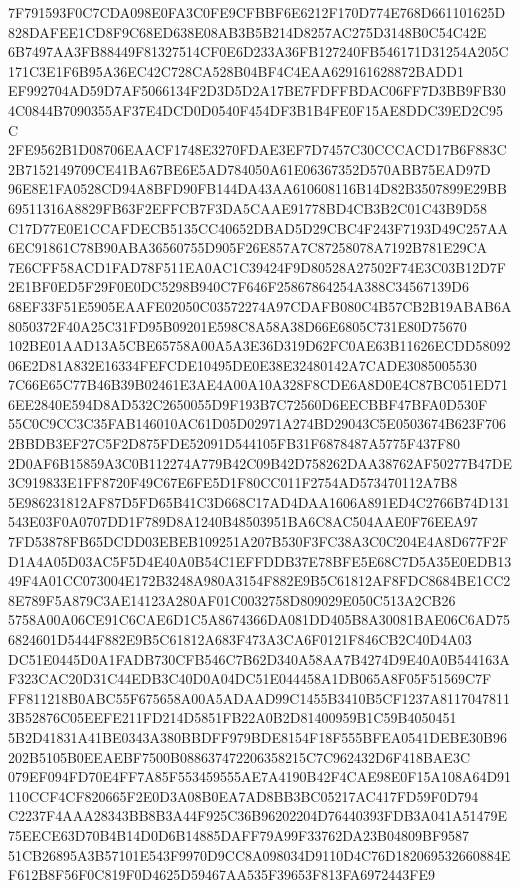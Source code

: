 \documentclass[UTF8,fontset=fandol,zihao=-4,a4paper]{ctexart}
\begin{document}
{{7F791593F0C7CDA098E0FA3C0FE9CFBBF6E6212F170D774E768D661101625D828DAFEE1CD8F9C68ED638E08AB3B5B214D8257AC275D3148B0C54C42E
6B7497AA3FB88449F81327514CF0E6D233A36FB127240FB546171D31254A205C171C3E1F6B95A36EC42C728CA528B04BF4C4EAA629161628872BADD1
EF992704AD59D7AF5066134F2D3D5D2A17BE7FDFFBDAC06FF7D3BB9FB304C0844B7090355AF37E4DCD0D0540F454DF3B1B4FE0F15AE8DDC39ED2C95C
2FE9562B1D08706EAACF1748E3270FDAE3EF7D7457C30CCCACD17B6F883C2B7152149709CE41BA67BE6E5AD784050A61E06367352D570ABB75EAD97D
96E8E1FA0528CD94A8BFD90FB144DA43AA610608116B14D82B3507899E29BB69511316A8829FB63F2EFFCB7F3DA5CAAE91778BD4CB3B2C01C43B9D58
C17D77E0E1CCAFDECB5135CC40652DBAD5D29CBC4F243F7193D49C257AA6EC91861C78B90ABA36560755D905F26E857A7C87258078A7192B781E29CA
7E6CFF58ACD1FAD78F511EA0AC1C39424F9D80528A27502F74E3C03B12D7F2E1BF0ED5F29F0E0DC5298B940C7F646F25867864254A388C34567139D6
68EF33F51E5905EAAFE02050C03572274A97CDAFB080C4B57CB2B19ABAB6A8050372F40A25C31FD95B09201E598C8A58A38D66E6805C731E80D75670
102BE01AAD13A5CBE65758A00A5A3E36D319D62FC0AE63B11626ECDD5809206E2D81A832E16334FEFCDE10495DE0E38E32480142A7CADE3085005530
7C66E65C77B46B39B02461E3AE4A00A10A328F8CDE6A8D0E4C87BC051ED716EE2840E594D8AD532C2650055D9F193B7C72560D6EECBBF47BFA0D530F
55C0C9CC3C35FAB146010AC61D05D02971A274BD29043C5E0503674B623F7062BBDB3EF27C5F2D875FDE52091D544105FB31F6878487A5775F437F80
2D0AF6B15859A3C0B112274A779B42C09B42D758262DAA38762AF50277B47DE3C919833E1FF8720F49C67E6FE5D1F80CC011F2754AD573470112A7B8
5E986231812AF87D5FD65B41C3D668C17AD4DAA1606A891ED4C2766B74D131543E03F0A0707DD1F789D8A1240B48503951BA6C8AC504AAE0F76EEA97
7FD53878FB65DCDD03EBEB109251A207B530F3FC38A3C0C204E4A8D677F2FD1A4A05D03AC5F5D4E40A0B54C1EFFDDB37E78BFE5E68C7D5A35E0EDB13
49F4A01CC073004E172B3248A980A3154F882E9B5C61812AF8FDC8684BE1CC28E789F5A879C3AE14123A280AF01C0032758D809029E050C513A2CB26
5758A00A06CE91C6CAE6D1C5A8674366DA081DD405B8A30081BAE06C6AD756824601D5444F882E9B5C61812A683F473A3CA6F0121F846CB2C40D4A03
DC51E0445D0A1FADB730CFB546C7B62D340A58AA7B4274D9E40A0B544163AF323CAC20D31C44EDB3C40D0A04DC51E044458A1DB065A8F05F51569C7F
FF811218B0ABC55F675658A00A5ADAAD99C1455B3410B5CF1237A81170478113B52876C05EEFE211FD214D5851FB22A0B2D81400959B1C59B4050451
5B2D41831A41BE0343A380BBDFF979BDE8154F18F555BFEA0541DEBE30B96202B5105B0EEAEBF7500B088637472206358215C7C962432D6F418BAE3C
079EF094FD70E4FF7A85F553459555AE7A4190B42F4CAE98E0F15A108A64D91110CCF4CF820665F2E0D3A08B0EA7AD8BB3BC05217AC417FD59F0D794
C2237F4AAA28343BB8B3A44F925C36B96202204D76440393FDB3A041A51479E75EECE63D70B4B14D0D6B14885DAFF79A99F33762DA23B04809BF9587
51CB26895A3B57101E543F9970D9CC8A098034D9110D4C76D182069532660884EF612B8F56F0C819F0D4625D59467AA535F39653F813FA6972443FE9
}}
\end{document}
